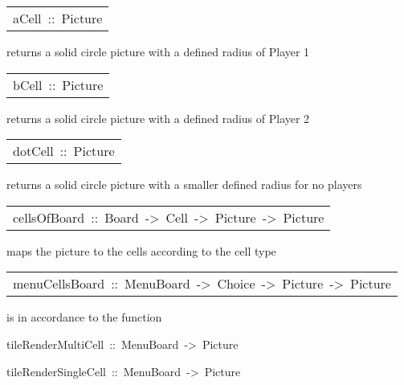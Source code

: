 \begin{haddockdesc}
\item[\begin{tabular}{@{}l}
aCell\ ::\ Picture
\end{tabular}]\haddockbegindoc
{} returns a solid circle picture with a defined radius of Player 1\par

\end{haddockdesc}
\begin{haddockdesc}
\item[\begin{tabular}{@{}l}
bCell\ ::\ Picture
\end{tabular}]\haddockbegindoc
{} returns a solid circle picture with a defined radius of Player 2\par

\end{haddockdesc}
\begin{haddockdesc}
\item[\begin{tabular}{@{}l}
dotCell\ ::\ Picture
\end{tabular}]\haddockbegindoc
{} returns a solid circle picture with a smaller defined radius for no players\par

\end{haddockdesc}
\begin{haddockdesc}
\item[\begin{tabular}{@{}l}
cellsOfBoard\ ::\ Board\ ->\ Cell\ ->\ Picture\ ->\ Picture
\end{tabular}]\haddockbegindoc
{} maps the  picture to the cells according to the cell type\par

\end{haddockdesc}
\begin{haddockdesc}
\item[\begin{tabular}{@{}l}
menuCellsBoard\ ::\ MenuBoard\ ->\ Choice\ ->\ Picture\ ->\ Picture
\end{tabular}]\haddockbegindoc
{} is in accordance to the  function\par

\end{haddockdesc}
\begin{haddockdesc}
\item[
tileRenderMultiCell\ ::\ MenuBoard\ ->\ Picture
]
\item[
tileRenderSingleCell\ ::\ MenuBoard\ ->\ Picture
]
\end{haddockdesc}
